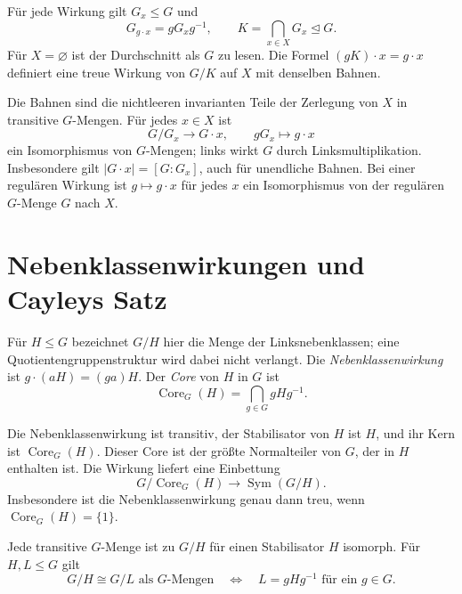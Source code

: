 \begin{theorem}
\label{b40guide:thm:stabilizers-kernel}
Für jede Wirkung gilt $G_x\leq G$ und
\[
 G_{g\cdot x}=gG_xg^{-1},\qquad
 K=\bigcap_{x\in X}G_x\mathrel{\trianglelefteq}G.
\]
Für $X=\varnothing$ ist der Durchschnitt als $G$ zu lesen.
Die Formel $(gK)\cdot x=g\cdot x$ definiert eine treue Wirkung
von $G/K$ auf $X$ mit denselben Bahnen.
\cite{milne}
\end{theorem}

\begin{theorem}
\label{b40guide:thm:orbit-stabilizer}
Die Bahnen sind die nichtleeren invarianten Teile der Zerlegung von $X$
in transitive $G$-Mengen. Für jedes $x\in X$ ist
\[
 G/G_x\longrightarrow G\cdot x,\qquad gG_x\longmapsto g\cdot x
\]
ein Isomorphismus von $G$-Mengen; links wirkt $G$ durch Linksmultiplikation.
Insbesondere gilt $|G\cdot x|=[G:G_x]$, auch für unendliche Bahnen.
Bei einer regulären Wirkung ist $g\mapsto g\cdot x$ für jedes $x$
ein Isomorphismus von der regulären $G$-Menge $G$ nach $X$.
\cite{milne}
\end{theorem}

\section{Nebenklassenwirkungen und Cayleys Satz}

\begin{definition}
\label{b40guide:def:core}
Für $H\leq G$ bezeichnet $G/H$ hier die Menge der Linksnebenklassen;
eine Quotientengruppenstruktur wird dabei nicht verlangt.
Die \emph{Nebenklassenwirkung} ist $g\cdot(aH)=(ga)H$.
Der \emph{Core} von $H$ in $G$ ist
\[
 \operatorname{Core}_G(H)=\bigcap_{g\in G}gHg^{-1}.
\]
\end{definition}

\begin{theorem}
\label{b40guide:thm:coset-core}
Die Nebenklassenwirkung ist transitiv, der Stabilisator von $H$ ist $H$,
und ihr Kern ist $\operatorname{Core}_G(H)$.
Dieser Core ist der größte Normalteiler von $G$, der in $H$ enthalten ist.
Die Wirkung liefert eine Einbettung
\[
 G/\operatorname{Core}_G(H)\longrightarrow\operatorname{Sym}(G/H).
\]
Insbesondere ist die Nebenklassenwirkung genau dann treu, wenn
$\operatorname{Core}_G(H)=\{1\}$.
\cite{milne}
\end{theorem}

\begin{theorem}
\label{b40guide:thm:transitive-classification}
Jede transitive $G$-Menge ist zu $G/H$ für einen Stabilisator $H$
isomorph. Für $H,L\leq G$ gilt
\[
 G/H\cong G/L\text{ als $G$-Mengen}
 \quad\Longleftrightarrow\quad
 L=gHg^{-1}\text{ für ein }g\in G.
\]
\cite{milne}
\end{theorem}

